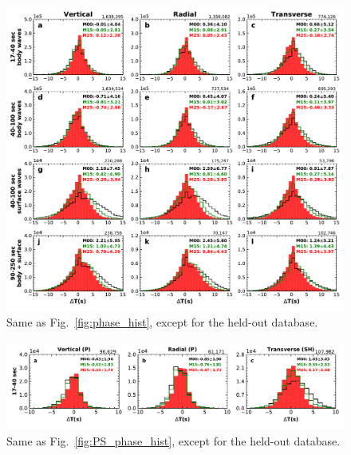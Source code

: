 
\begin{figure}
  \centering
  \includegraphics[width=\textwidth]{ch-GLADM25/figures/dt_histogram_360.pdf}
  \caption{\small{Same as Fig.~\ref{fig:phase_hist}, except for the held-out database.
  }}
  \label{fig:phase_hist_360}
\end{figure}

\begin{figure}
  \centering
  \includegraphics[width=\textwidth]{ch-GLADM25/figures/dt_histogram_360_phase.pdf}
  \caption{\small{Same as Fig.~\ref{fig:PS_phase_hist}, except for the held-out database.}}
  \label{fig:phase_hist_360_P}
\end{figure}

